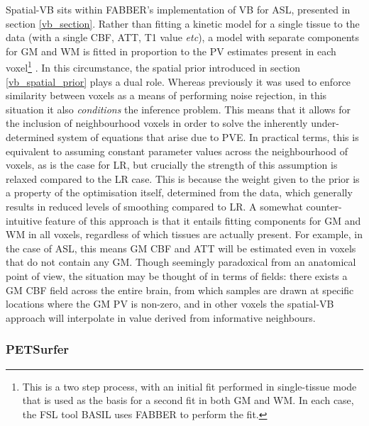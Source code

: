 Spatial-VB sits within FABBER's implementation of VB for ASL, presented in section \ref{vb_section}. Rather than fitting a kinetic model for a single tissue to the data (with a single CBF, ATT, T1 value \textit{etc}), a model with separate components for GM and WM is fitted in proportion to the PV estimates present in each voxel\footnote{This is a two step process, with an initial fit performed in single-tissue mode that is used as the basis for a second fit in both GM and WM. In each case, the FSL tool BASIL uses FABBER to perform the fit.} \cite{Chappell2011}. In this circumstance, the spatial prior introduced in section \ref{vb_spatial_prior} plays a dual role. Whereas previously it was used to enforce similarity between voxels as a means of performing noise rejection, in this situation it also \textit{conditions} the inference problem. This means that it allows for the inclusion of neighbourhood voxels in order to solve the inherently under-determined system of equations that arise due to PVE. In practical terms, this is equivalent to assuming constant parameter values across the neighbourhood of voxels, as is the case for LR, but crucially the strength of this assumption is relaxed compared to the LR case. This is because the weight given to the prior is a property of the optimisation itself, determined from the data, which generally results in reduced levels of smoothing compared to LR. A somewhat counter-intuitive feature of this approach is that it entails fitting components for GM and WM in all voxels, regardless of which tissues are actually present. For example, in the case of ASL, this means GM CBF and ATT will be estimated even in voxels that do not contain any GM. Though seemingly paradoxical from an anatomical point of view, the situation may be thought of in terms of fields: there exists a GM CBF field across the entire brain, from which samples are drawn at specific locations where the GM PV is non-zero, and in other voxels the spatial-VB approach will interpolate in value derived from informative neighbours. 

\subsubsection{PETSurfer}

